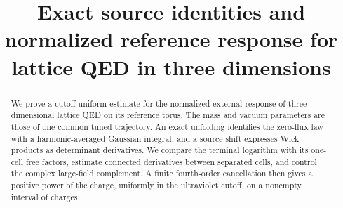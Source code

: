 \theoremstyle{remark}
\newtheorem{remark}[ms@proposition]{Remark}
\newtheorem*{remark*}{Remark}


  \RequirePackage[backend=biber,style=alphabetic,backref=true,
    giveninits=true,isbn=false,date=year]{biblatex}
  
  \setcounter{biburlnumpenalty}{100}
  \setcounter{biburllcpenalty}{100}
  \setcounter{biburlucpenalty}{100}
  \renewcommand*{\bibfont}{\footnotesize}
\makeatother
\usepackage{mathrsfs}
\newcommand{\R}{\mathbb R}
\newcommand{\C}{\mathbb C}
\newcommand{\Z}{\mathbb Z}
\newcommand{\E}{\mathbb E}
\newcommand{\dd}{\mathrm d}
\DeclareMathOperator{\supp}{supp}
\DeclareMathOperator{\tr}{tr}
\allowdisplaybreaks
\title[Source identities and reference response]{Exact source identities and normalized reference response for lattice QED in three dimensions}
\date{}

\begin{abstract}
We prove a cutoff-uniform estimate for the normalized external response
of three-dimensional lattice QED on its reference torus. The mass and
vacuum parameters are those of one common tuned trajectory. An exact
unfolding identifies the zero-flux law with a harmonic-averaged Gaussian
integral, and a source shift expresses Wick products as determinant
derivatives. We compare the terminal logarithm with its one-cell free
factors, estimate connected derivatives between separated cells, and
control the complex large-field complement. A finite fourth-order
cancellation then gives a positive power of the charge, uniformly in
the ultraviolet cutoff, on a nonempty interval of charges.
\end{abstract}
\maketitle
\tableofcontents
